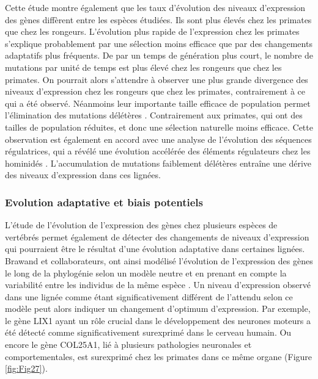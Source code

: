 Cette étude montre également que les taux d’évolution des niveaux d'expression des gènes diffèrent entre les espèces étudiées. Ils sont plus élevés chez les primates que chez les rongeurs. L'évolution plus rapide de l'expression chez les primates s'explique probablement par une sélection moins efficace que par des changements adaptatifs plus fréquents. De par un temps de génération plus court, le nombre de mutations par unité de temps est plus élevé chez les rongeurs que chez les primates. On pourrait alors s’attendre à observer une plus grande divergence des niveaux d’expression chez les rongeurs que chez les primates, contrairement à ce qui a été observé. Néanmoins leur importante taille efficace de population permet l’élimination des mutations délétères \citep{ohta_slightly_1973}. Contrairement aux primates, qui ont des tailles de population réduites, et donc une sélection naturelle moins efficace. Cette observation est également en accord avec une analyse de l'évolution des séquences régulatrices, qui a révélé une évolution accélérée des éléments régulateurs chez les hominidés \citep{keightley_evidence_2005}. L’accumulation de mutations faiblement délétères entraîne une dérive des niveaux d’expression dans ces lignées.

\subsubsection{Evolution adaptative et biais potentiels}
\label{subsec:evol-adaptative}

L’étude de l’évolution de l’expression des gènes chez plusieurs espèces de vertébrés permet également de détecter des changements de niveaux d’expression qui pourraient être le résultat d’une évolution adaptative dans certaines lignées. Brawand et collaborateurs, ont ainsi modélisé l’évolution de l’expression des gènes le long de la phylogénie selon un modèle neutre et en prenant en compte la variabilité entre les individus de la même espèce \citep{brawand_evolution_2011}. Un niveau d’expression observé dans une lignée comme étant significativement différent de l’attendu selon ce modèle peut alors indiquer un changement d’optimum d’expression. Par exemple, le gène LIX1 ayant un rôle crucial dans le développement des neurones moteurs a été détecté comme significativement surexprimé dans le cerveau humain. Ou encore le gène COL25A1, lié à plusieurs pathologies neuronales et comportementales, est surexprimé chez les primates dans ce même organe (Figure \ref{fig:Fig27}). 

